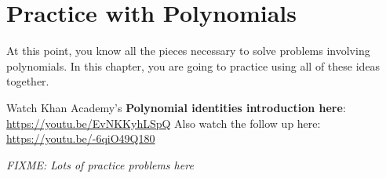 \chapter{Practice with Polynomials}

At this point, you know all the pieces necessary to solve problems
involving polynomials. In this chapter, you are going to practice
using all of these ideas together.

Watch Khan Academy's \textbf{Polynomial identities introduction here}: \url{https://youtu.be/EvNKKyhLSpQ}
Also watch the follow up here: \url{https://youtu.be/-6qiO49Q180}

\textit{FIXME: Lots of practice problems here}
